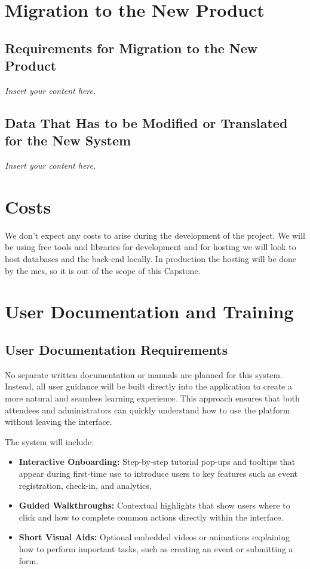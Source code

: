 \documentclass[12pt]{article}
\newcommand{\lips}{\textit{Insert your content here.}}
\begin{document}
\section{Migration to the New Product}
\subsection{Requirements for Migration to the New Product}
\lips
\subsection{Data That Has to be Modified or Translated for the New System}
\lips

\section{Costs}
We don't expect any costs to arise during the development of the project. We will be using free tools and libraries for
development and for hosting we will look to host databases and the back-end locally. In production the hosting will be
done by the \gls{mes}, so it is out of the scope of this Capstone.

\section{User Documentation and Training}

\subsection{User Documentation Requirements}

No separate written documentation or manuals are planned for this system.
Instead, all user guidance will be built directly into the application to create a more natural and seamless learning experience.
This approach ensures that both attendees and administrators can quickly understand how to use the platform without leaving the interface.

The system will include:
\begin{itemize}
    \item \textbf{Interactive Onboarding:}
    Step-by-step tutorial pop-ups and tooltips that appear during first-time use to introduce users to key features such as event registration, check-in, and analytics.

    \item \textbf{Guided Walkthroughs:}
    Contextual highlights that show users where to click and how to complete common actions directly within the interface.

    \item \textbf{Short Visual Aids:}
    Optional embedded videos or animations explaining how to perform important tasks, such as creating an event or submitting a form.
\end{itemize}
\end{document}

